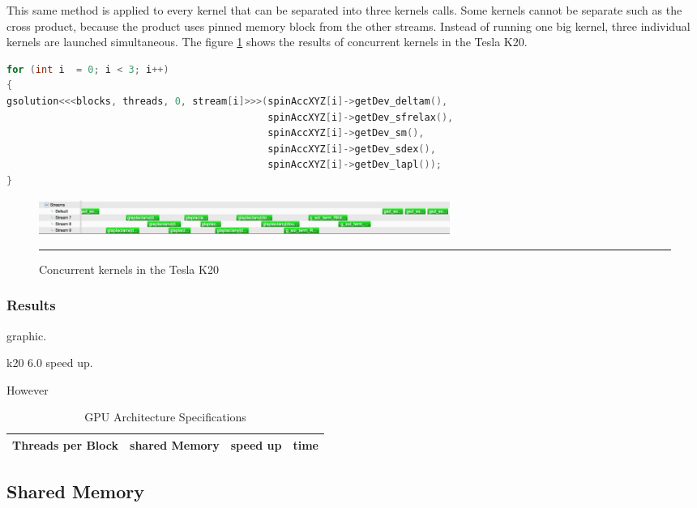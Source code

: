 This same method is applied to every kernel that can be separated into three kernels calls. Some kernels cannot be separate such as the cross product, because the product uses pinned memory block from the other streams. Instead of running one big kernel, three individual kernels are launched simultaneous. The figure \ref{fig:concurrent} shows the results of concurrent kernels in the Tesla K20.

\begin{lstlisting}[language=C++, caption={Evaluation of individual coordinates of the Zhang and Li model}]
for (int i  = 0; i < 3; i++)
{
gsolution<<<blocks, threads, 0, stream[i]>>>(spinAccXYZ[i]->getDev_deltam(),
											 spinAccXYZ[i]->getDev_sfrelax(), 
											 spinAccXYZ[i]->getDev_sm(), 
											 spinAccXYZ[i]->getDev_sdex(),
											 spinAccXYZ[i]->getDev_lapl());
}
\end{lstlisting}


\begin{figure}[htbp]
	\centering
		\includegraphics[width=0.65\textwidth]{Figures/concurent.png}
		\rule{35em}{0.2pt}
	\caption[Streams kernels Tesla K20]{Concurrent kernels in the Tesla K20
}
	\label{fig:concurrent}
\end{figure}


\subsubsection{Results}

graphic.

k20  6.0 speed up.

However


\begin{table}[h]
\centering
  \begin{tabular} { | l | l | l |}
    \hline
    Threads per Block & shared Memory & speed up & time \\
    \hline
    
   \hline
  \end{tabular}
  \caption{GPU Architecture Specifications}
  \label{tab:arch}
  \end{table}



\subsection{Shared Memory}

